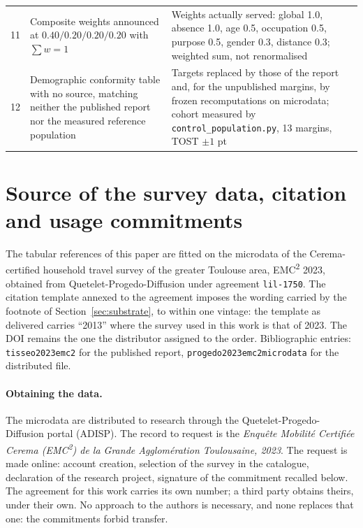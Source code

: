\begin{table}[tp]
\begin{tabular}{rp{}p{}}
    11 & Composite weights announced at $0.40 / 0.20 / 0.20 / 0.20$ with $\sum w = 1$ & Weights actually served: global 1.0, absence 1.0, age 0.5, occupation 0.5, purpose 0.5, gender 0.3, distance 0.3; weighted sum, not renormalised \\
    12 & Demographic conformity table with no source, matching neither the published report nor the measured reference population & Targets replaced by those of the report and, for the unpublished margins, by frozen recomputations on microdata; cohort measured by \texttt{control\_population.py}, 13 margins, TOST $\pm 1$ pt \\
    \bottomrule
  \end{tabular}
\end{table}

\section{Source of the survey data, citation and usage commitments}
\label{app:margins}

The tabular references of this paper are fitted on the microdata of the Cerema-certified household travel survey of the greater Toulouse area, EMC\textsuperscript{2} 2023, obtained from Quetelet-Progedo-Diffusion under agreement \texttt{lil-1750}. The citation template annexed to the agreement imposes the wording carried by the footnote of Section~\ref{sec:substrate}, to within one vintage: the template as delivered carries ``2013'' where the survey used in this work is that of 2023. The DOI remains the one the distributor assigned to the order. Bibliographic entries: \texttt{tisseo2023emc2} for the published report, \texttt{progedo2023emc2microdata} for the distributed file.

\paragraph{Obtaining the data.} The microdata are distributed to research through the Quetelet-Progedo-Diffusion portal (ADISP). The record to request is the \textit{Enqu\^ete Mobilit\'e Certifi\'ee Cerema (EMC\textsuperscript{2}) de la Grande Agglom\'eration Toulousaine, 2023}. The request is made online: account creation, selection of the survey in the catalogue, declaration of the research project, signature of the commitment recalled below. The agreement for this work carries its own number; a third party obtains theirs, under their own. No approach to the authors is necessary, and none replaces that one: the commitments forbid transfer.

